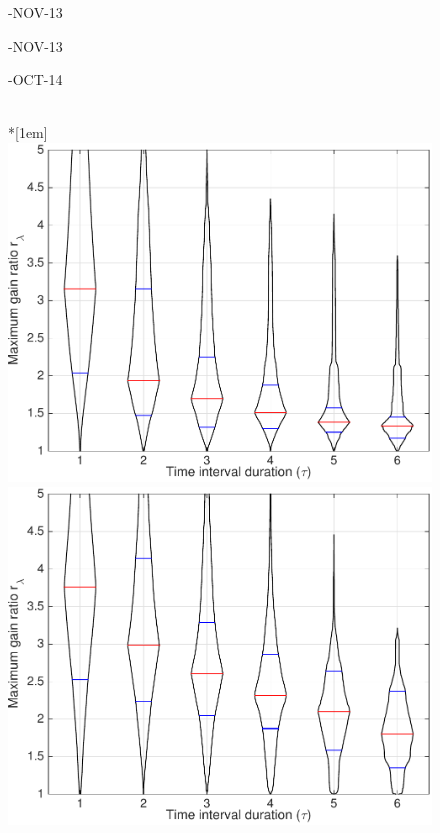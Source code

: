 \begin{figure}
\parbox{\mylength}{-NOV-13}
\parbox{\mylength}{-NOV-13}
\parbox{\mylength}{-OCT-14} \\*[1em]
\includegraphics[width=\mylength]{dist/20141006-maxGain-local-relativePerf}
\includegraphics[width=\mylength]{dist/20141011-maxGain-local-relativePerf}

\end{figure}
